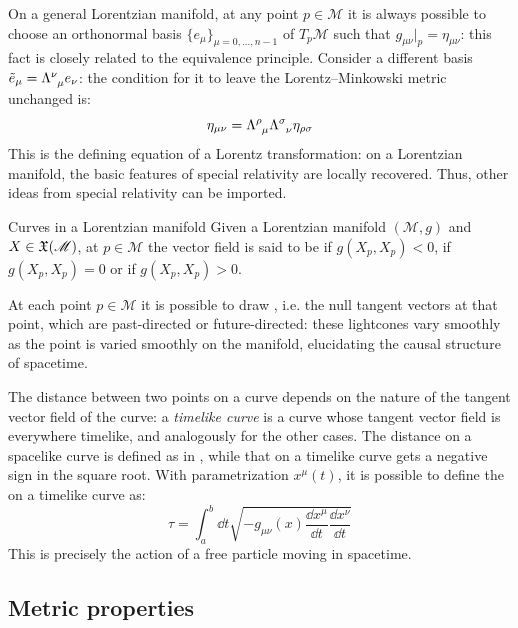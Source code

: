 On a general Lorentzian manifold, at any point $ p \in \mathcal{M} $ it is always possible to choose an orthonormal basis $ \{e_{\mu}\}_{\mu = 0,\dots,n-1} $ of $ T_p \mathcal{M} $ such that $ g_{\mu \nu} \vert_p = \eta_{\mu \nu} $: this fact is closely related to the equivalence principle. Consider a different basis $ \tilde{e}_{\mu} = \tensor{\Lambda}{^\nu _\mu} e_{\nu} $: the condition for it to leave the Lorentz--Minkowski metric unchanged is:
\begin{equation}
  \eta_{\mu \nu} = \tensor{\Lambda}{^\rho _\mu} \tensor{\Lambda}{^\sigma _\nu} \eta_{\rho \sigma}
\end{equation}
This is the defining equation of a Lorentz transformation: on a Lorentzian manifold, the basic features of special relativity are locally recovered. Thus, other ideas from special relativity can be imported.

\begin{definition}{Curves in a Lorentzian manifold}{}
  Given a Lorentzian manifold $ (\mathcal{M},g) $ and $ X \in \mathfrak{X}(\mathscr{M}) $, at $ p \in \mathcal{M} $ the vector field is said to be  if $ g(X_p,X_p) < 0 $,  if $ g(X_p,X_p) = 0 $ or  if $ g(X_p,X_p) > 0 $.
\end{definition}

At each point $ p \in \mathcal{M} $ it is possible to draw , i.e. the null tangent vectors at that point, which are past-directed or future-directed: these lightcones vary smoothly as the point is varied smoothly on the manifold, elucidating the causal structure of spacetime.

The distance between two points on a curve depends on the nature of the tangent vector field of the curve: a \textit{timelike curve} is a curve whose tangent vector field is everywhere timelike, and analogously for the other cases. The distance on a spacelike curve is defined as in , while that on a timelike curve gets a negative sign in the square root. With parametrization $ x^{\mu}(t) $, it is possible to define the  on a timelike curve as:
\begin{equation}
  \tau = \int_a^b \dd t \sqrt{- g_{\mu \nu}(x) \frac{\dd x^{\mu}}{\dd t} \frac{\dd x^{\nu}}{\dd t}}
\end{equation}
This is precisely the action of a free particle moving in spacetime.

\subsection{Metric properties}

